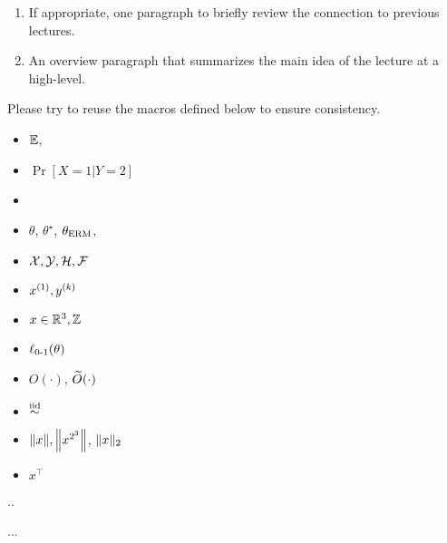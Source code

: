 
\setcounter{section}{0}



\begin{enumerate}
	\item If appropriate, one paragraph to briefly review the connection to previous lectures.
	\item An overview paragraph that summarizes the main idea of the lecture at a high-level. 
\end{enumerate}  
Please try to reuse the macros defined below to ensure consistency.
\begin{itemize}
	\item $\Exp$, 
	\item $\Pr[X=1\vert Y=2]$
	\item 
	\item 
	$\theta$, $\theta^\star$, $\thetaerm$, 
	\item 
	$\cX,\cY, \cH, \cF$
	\item $x\sp{1}, y\sp{k}$
	\item 
	$x\in \R^3, \bbZ$
	\item $\err(\theta)$
	\item $O(\cdot)$, $\tilO(\cdot)$
	\item $\iid$
	\item $\norm{x}, \Norm{x^{2^3}}$, $\norm{x}_{2}$
	\item $x^\top$ 
\end{itemize}
\begin{theorem}
	..
\end{theorem}
\begin{lemma}
	...
\end{lemma}


	
\lipsum
